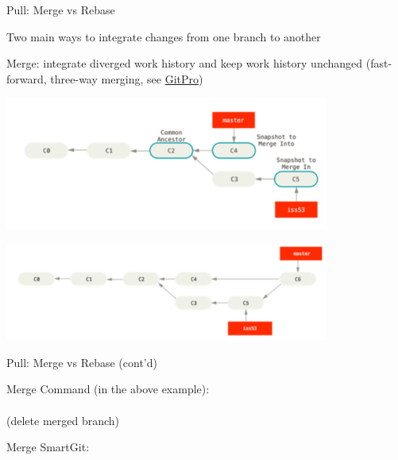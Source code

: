 \documentclass[hyperref,compress,handout,9pt,usepdftitle=false]{beamer}
\begin{document}
\begin{frame}{Pull: Merge vs Rebase}
\begin{witemize}
\item Two main ways to integrate changes from one branch to another
\item Merge: integrate diverged work history and keep work history unchanged (fast-forward, three-way merging, see \href{https://progit2.s3.amazonaws.com/en/2016-03-22-f3531/progit-en.1084.pdf}{GitPro})
\begin{center}
	\includegraphics[width=0.8\textwidth]{merge1}
\end{center}
\begin{center}
	\includegraphics[width=0.8\textwidth]{merge2}
\end{center}
\end{witemize}
\end{frame}

\begin{frame}{Pull: Merge vs Rebase (cont'd)}
	\begin{witemize}
		\item Merge Command (in the above example):\\ \\
		 (delete merged branch)
		\item Merge SmartGit: 
		
	\end{witemize}
\end{frame}
\end{document}
